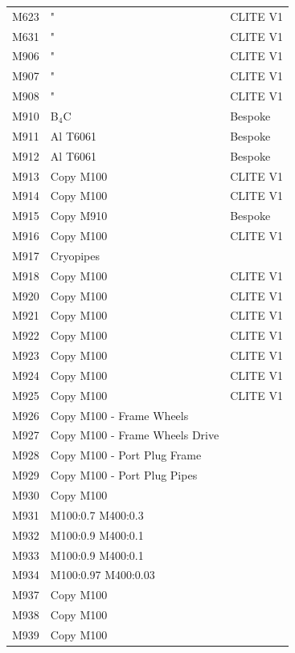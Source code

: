 \documentclass[12pt]{article}
\begin{document}
\begin{centering}
\begin{longtable}[ht!]{ p{} | p{} | p{} }
  M623  & " &  CLITE V1 \\
  M631  & " &  CLITE V1 \\
  M906  & " &  CLITE V1 \\
  M907  & " &  CLITE V1 \\
  M908  & " &  CLITE V1 \\
  M910 & B$_4$C & Bespoke  \\
  M911 & Al T6061 & Bespoke  \\
  M912 & Al T6061 & Bespoke  \\
  M913 & Copy M100 & CLITE V1\\
  M914 & Copy M100 & CLITE V1\\
  M915 & Copy M910 & Bespoke \\
  M916 & Copy M100 & CLITE V1\\
  M917 & Cryopipes & \cite{cryopump_communication}\\
  M918 & Copy M100 & CLITE V1 \\
  M920 & Copy M100 & CLITE V1 \\
  M921 & Copy M100 & CLITE V1 \\
  M922 & Copy M100 & CLITE V1 \\
  M923 & Copy M100 & CLITE V1 \\
  M924 & Copy M100 & CLITE V1 \\
  M925 & Copy M100 & CLITE V1 \\
  M926 & Copy M100 - Frame Wheels & \cite{bertalot_communication}\\
  M927 & Copy M100 - Frame Wheels Drive & \cite{bertalot_communication}\\
  M928 & Copy M100 - Port Plug Frame & \cite{bertalot_communication}\\
  M929 & Copy M100 - Port Plug Pipes & \cite{bertalot_communication}\\
  M930 & Copy M100 & \cite{cryopump_communication}\\
  M931 & M100:0.7 M400:0.3 & \cite{bertalot_communication}\\
  M932 & M100:0.9 M400:0.1 & \cite{bertalot_communication}\\
  M933 & M100:0.9 M400:0.1 & \cite{bertalot_communication}\\
  M934 & M100:0.97 M400:0.03 & \cite{bertalot_communication}\\
  M937 & Copy M100 & \cite{cryopump_communication}\\
  M938 & Copy M100 & \cite{cryopump_communication}\\
  M939 & Copy M100 & \cite{cryopump_communication}\\

\end{longtable}
\end{centering}
\end{document}
